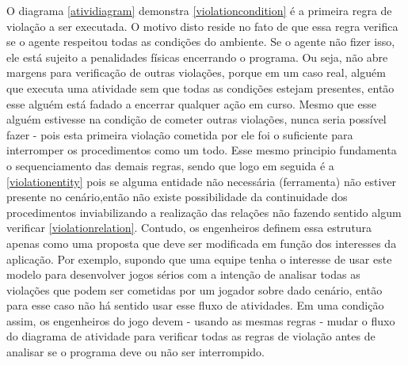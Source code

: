 O diagrama \ref{atividiagram} demonstra \ref{violationcondition} é a primeira regra de violação a ser executada. O motivo disto reside no fato de que essa regra verifica se o agente respeitou todas as condições do ambiente. Se o agente não fizer isso, ele está sujeito a penalidades físicas encerrando o programa. Ou seja, não abre margens para verificação de outras violações, porque em um caso real, alguém que executa uma atividade sem que todas as condições estejam presentes, então esse alguém está fadado a encerrar qualquer ação em curso. Mesmo que esse alguém estivesse na condição de cometer outras violações, nunca seria possível fazer - pois esta primeira violação cometida por ele foi o suficiente para interromper os procedimentos como um todo. Esse mesmo principio fundamenta o sequenciamento das demais regras, sendo que logo em seguida é a \ref{violationentity} pois se alguma entidade não necessária (ferramenta) não estiver presente no cenário,então não existe possibilidade da continuidade dos procedimentos inviabilizando a realização das relações não fazendo sentido algum verificar \ref{violationrelation}. Contudo, os engenheiros definem essa estrutura apenas como uma proposta que deve ser modificada em função dos interesses da aplicação. Por exemplo, supondo que uma equipe tenha o interesse de usar este modelo para desenvolver jogos sérios com a intenção de analisar todas as violações que podem ser cometidas por um jogador sobre dado cenário, então para esse caso não há sentido usar esse fluxo de atividades. Em uma condição assim, os engenheiros do jogo devem - usando as mesmas regras - mudar o fluxo do diagrama de atividade para verificar todas as regras de violação antes de analisar se o programa deve ou não ser interrompido.